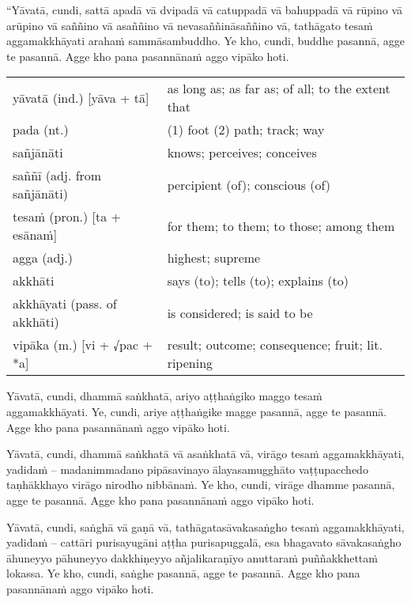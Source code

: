 \documentclass[11pt,oneside]{memoir}
\begin{document}
\begin{spacedquote}
“Yāvatā, cundi, sattā apadā vā dvipadā vā catuppadā vā bahuppadā vā rūpino vā
arūpino vā saññino vā asaññino vā nevasaññināsaññino vā,
tathāgato tesaṁ aggamakkhāyati arahaṁ sammāsambuddho.
Ye kho, cundi, buddhe pasannā, agge te pasannā.
Agge kho pana pasannānaṁ aggo vipāko hoti.
\end{spacedquote}

\begin{longtable}{L{\colOne} L{\colTwo}}
yāvatā (ind.) [yāva + tā] & as long as; as far as; of all; to the extent that\\[0pt]
pada (nt.) & (1) foot (2) path; track; way\\[0pt]
sañjānāti & knows; perceives; conceives\\[0pt]
saññī (adj. from sañjānāti) & percipient (of); conscious (of)\\[0pt]
tesaṁ (pron.) [ta + esānaṁ] & for them; to them; to those; among them\\[0pt]
agga (adj.) & highest; supreme\\[0pt]
akkhāti & says (to); tells (to); explains (to)\\[0pt]
akkhāyati (pass. of akkhāti) & is considered; is said to be\\[0pt]
vipāka (m.) [vi + √pac + *a] & result; outcome; consequence; fruit; lit. ripening\\[0pt]
\end{longtable}

\clearpage

\begin{spacedquote}
Yāvatā, cundi, dhammā saṅkhatā, ariyo aṭṭhaṅgiko maggo tesaṁ aggamakkhāyati.
Ye, cundi, ariye aṭṭhaṅgike magge pasannā, agge te pasannā.
Agge kho pana pasannānaṁ aggo vipāko hoti.

Yāvatā, cundi, dhammā saṅkhatā vā asaṅkhatā vā, virāgo tesaṁ aggamakkhāyati,
yadidaṁ -- madanimmadano pipāsavinayo ālayasamugghāto vaṭṭupacchedo taṇhākkhayo
virāgo nirodho nibbānaṁ.
Ye kho, cundi, virāge dhamme pasannā, agge te pasannā.
Agge kho pana pasannānaṁ aggo vipāko hoti.

Yāvatā, cundi, saṅghā vā gaṇā vā, tathāgatasāvakasaṅgho tesaṁ aggamakkhāyati,
yadidaṁ -- cattāri purisayugāni aṭṭha purisapuggalā, esa bhagavato sāvakasaṅgho
āhuneyyo pāhuneyyo dakkhiṇeyyo añjalikaraṇīyo anuttaraṁ puññakkhettaṁ lokassa.
Ye kho, cundi, saṅghe pasannā, agge te pasannā.
Agge kho pana pasannānaṁ aggo vipāko hoti.
\end{spacedquote}
\end{document}
